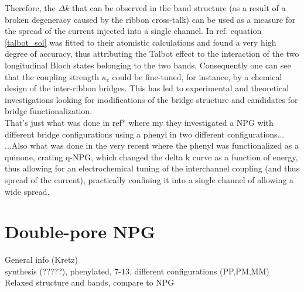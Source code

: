 Therefore, the \(\Delta k\) that can be observed in the band structure (as a result of a broken degeneracy caused by the ribbon cross-talk) can be used as a measure for the spread of the current injected into a single channel. In ref. \parencite{Calogero2019} equation \ref{talbot_sol} was fitted to their atomistic calculations and found a very high degree of accuracy, thus attributing the Talbot effect to the interaction of the two longitudinal Bloch states belonging to the two bands. Consequently one can see that the coupling
strength \(\kappa_c\) could be fine-tuned, for instance, by a chemical design of the inter-ribbon bridges\parencite{Calogero2019}. This has led to experimental and theoretical investigations looking for modifications of the bridge structure\parencite{Calogero2019a} and candidates for bridge functionalization\parencite{Alcon2021}.\\

That's just what was done in ref* where my they investigated a NPG with different bridge configurations using a phenyl in two different configurations...\\

...Also what was done in the very recent where the phenyl was functionalized as a quinone, crating q-NPG, which changed the delta k curve as a function of energy, thus allowing for an electrochemical tuning of the interchannel coupling (and thus spread of the current), practically confining it into a single channel of allowing a wide spread.


\section{Double-pore NPG}
General info (Kretz)\\
synthesis (?????), phenylated, 7-13, different configurations (PP,PM,MM)\\
Relaxed structure and bands, compare to NPG



